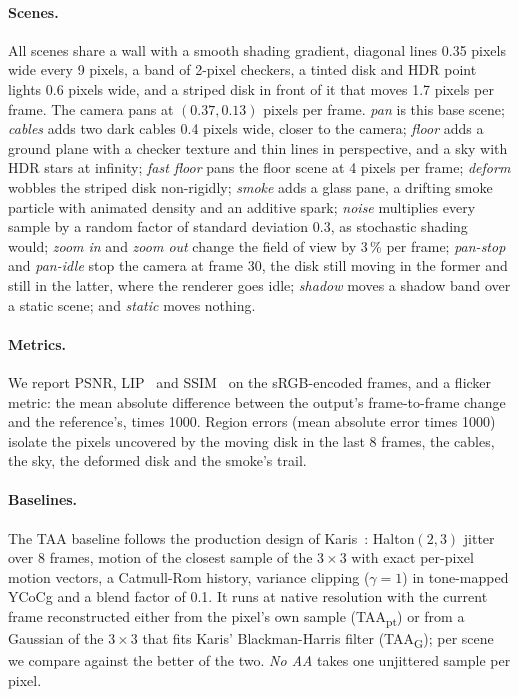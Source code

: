 \documentclass[11pt,a4paper]{article}
\newcommand{\FLIP}{\reflectbox{F}LIP}
\begin{document}
\paragraph{Scenes.} All scenes share a wall with a smooth shading gradient, diagonal lines 0.35 pixels wide every 9 pixels, a band of 2-pixel checkers, a tinted disk and HDR point lights 0.6 pixels wide, and a striped disk in front of it that moves 1.7 pixels per frame. The camera pans at $(0.37, 0.13)$ pixels per frame. \emph{pan} is this base scene; \emph{cables} adds two dark cables 0.4 pixels wide, closer to the camera; \emph{floor} adds a ground plane with a checker texture and thin lines in perspective, and a sky with HDR stars at infinity; \emph{fast floor} pans the floor scene at 4 pixels per frame; \emph{deform} wobbles the striped disk non-rigidly; \emph{smoke} adds a glass pane, a drifting smoke particle with animated density and an additive spark; \emph{noise} multiplies every sample by a random factor of standard deviation 0.3, as stochastic shading would; \emph{zoom in} and \emph{zoom out} change the field of view by 3\,\% per frame; \emph{pan-stop} and \emph{pan-idle} stop the camera at frame 30, the disk still moving in the former and still in the latter, where the renderer goes idle; \emph{shadow} moves a shadow band over a static scene; and \emph{static} moves nothing.

\paragraph{Metrics.} We report PSNR, \FLIP{}~\cite{andersson2020flip} and SSIM~\cite{wang2004ssim} on the sRGB-encoded frames, and a flicker metric: the mean absolute difference between the output's frame-to-frame change and the reference's, times 1000. Region errors (mean absolute error times 1000) isolate the pixels uncovered by the moving disk in the last 8 frames, the cables, the sky, the deformed disk and the smoke's trail.

\paragraph{Baselines.} The TAA baseline follows the production design of Karis~\cite{karis2014taa}: Halton$(2,3)$ jitter over 8 frames, motion of the closest sample of the $3\times3$ with exact per-pixel motion vectors, a Catmull-Rom history, variance clipping ($\gamma=1$) in tone-mapped YCoCg and a blend factor of 0.1. It runs at native resolution with the current frame reconstructed either from the pixel's own sample (TAA\textsubscript{pt}) or from a Gaussian of the $3\times3$ that fits Karis' Blackman-Harris filter (TAA\textsubscript{G}); per scene we compare against the better of the two. \emph{No AA} takes one unjittered sample per pixel.
\end{document}
